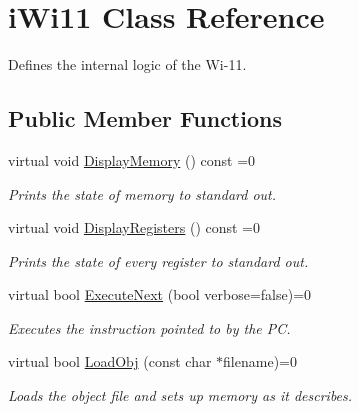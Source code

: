 \hypertarget{classiWi11}{
\section{iWi11 Class Reference}
\label{classiWi11}
}


Defines the internal logic of the Wi-\/11.  


\subsection*{Public Member Functions}
\begin{DoxyCompactItemize}
\item 
virtual void \hyperlink{classiWi11_ad9b13831ad9a83a8abbc3a77794b38bc}{DisplayMemory} () const =0
\begin{DoxyCompactList}\small\item\em Prints the state of memory to standard out. \item\end{DoxyCompactList}\item 
virtual void \hyperlink{classiWi11_a143e669e3c7f46c3d1524838c8d74d94}{DisplayRegisters} () const =0
\begin{DoxyCompactList}\small\item\em Prints the state of every register to standard out. \item\end{DoxyCompactList}\item 
virtual bool \hyperlink{classiWi11_ae502d86eb25fe6e1169e800939362074}{ExecuteNext} (bool verbose=false)=0
\begin{DoxyCompactList}\small\item\em Executes the instruction pointed to by the PC. \item\end{DoxyCompactList}\item 
virtual bool \hyperlink{classiWi11_a87f8cd9014f7ae2edaa8928257fc84e9}{LoadObj} (const char $\ast$filename)=0
\begin{DoxyCompactList}\small\item\em Loads the object file and sets up memory as it describes. \item\end{DoxyCompactList}\end{DoxyCompactItemize}
